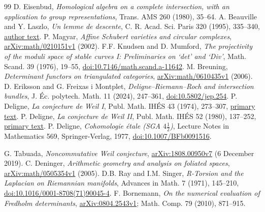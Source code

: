 \documentclass[11pt,oneside,openany]{book}
\theoremstyle{definition}\newtheorem{definition}[theorem]{Definition}
\theoremstyle{remark}\newtheorem{remark}[theorem]{Remark}
\begin{document}
\begin{thebibliography}{99}
 D. Eisenbud, \emph{Homological algebra on a complete intersection, with an application to group representations}, Trans. AMS 260 (1980), 35--64.
 A. Beauville and Y. Laszlo, \emph{Un lemme de descente}, C. R. Acad. Sci. Paris 320 (1995), 335--340, \href{https://math.univ-cotedazur.fr/~beauvill/pubs/descente.pdf}{author text}.
 P. Magyar, \emph{Affine Schubert varieties and circular complexes}, \href{https://arxiv.org/abs/math/0210151v1}{arXiv:math/0210151v1} (2002).
 F.F. Knudsen and D. Mumford, \emph{The projectivity of the moduli space of stable curves I: Preliminaries on `det' and `Div'}, Math. Scand. 39 (1976), 19--55, \href{https://doi.org/10.7146/math.scand.a-11642}{doi:10.7146/math.scand.a-11642}.
 M. Breuning, \emph{Determinant functors on triangulated categories}, \href{https://arxiv.org/abs/math/0610435v1}{arXiv:math/0610435v1} (2006).
 D. Eriksson and G. Freixas i Montplet, \emph{Deligne--Riemann--Roch and intersection bundles}, J. \'Ec. polytech. Math. 11 (2024), 247--361, \href{https://doi.org/10.5802/jep.254}{doi:10.5802/jep.254}.
 P. Deligne, \emph{La conjecture de Weil I}, Publ. Math. IH\'ES 43 (1974), 273--307, \href{https://www.numdam.org/item/PMIHES_1974__43__273_0.pdf}{primary text}.
 P. Deligne, \emph{La conjecture de Weil II}, Publ. Math. IH\'ES 52 (1980), 137--252, \href{https://numdam.org/articles/10.1007/BF02684780/}{primary text}.
 P. Deligne,
\emph{Cohomologie \'etale (SGA $4\frac12$)}, Lecture Notes in Mathematics 569,
Springer-Verlag, 1977,
\href{https://doi.org/10.1007/BFb0091516}{doi:10.1007/BFb0091516}.

 G. Tabuada, \emph{Noncommutative Weil conjecture}, \href{https://arxiv.org/abs/1808.00950v7}{arXiv:1808.00950v7} (6 December 2019).
 C. Deninger, \emph{Arithmetic geometry and analysis on foliated spaces}, \href{https://arxiv.org/abs/math/0505354v1}{arXiv:math/0505354v1} (2005).
 D.B. Ray and I.M. Singer, \emph{R-Torsion and the Laplacian on Riemannian manifolds}, Advances in Math. 7 (1971), 145--210, \href{https://doi.org/10.1016/0001-8708(71)90045-4}{doi:10.1016/0001-8708(71)90045-4}.
 F. Bornemann, \emph{On the numerical evaluation of Fredholm determinants}, \href{https://arxiv.org/abs/0804.2543v1}{arXiv:0804.2543v1}; Math. Comp. 79 (2010), 871--915.




\end{thebibliography}
\end{document}
